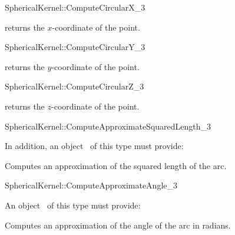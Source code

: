 \begin{ccRefFunctionObjectConcept}{SphericalKernel::ComputeCircularX_3}


       {returns the $x$-coordinate of the point.}

\end{ccRefFunctionObjectConcept}
\begin{ccRefFunctionObjectConcept}{SphericalKernel::ComputeCircularY_3}


       {returns the $y$-coordinate of the point.}

\end{ccRefFunctionObjectConcept}
\begin{ccRefFunctionObjectConcept}{SphericalKernel::ComputeCircularZ_3}


       {returns the $z$-coordinate of the point.}

\end{ccRefFunctionObjectConcept}
\begin{ccRefFunctionObjectConcept}{SphericalKernel::ComputeApproximateSquaredLength_3}

\ccRefines



In addition, an object \ccVar\ of this type must provide:

{Computes an approximation of the squared length of the arc.}

\end{ccRefFunctionObjectConcept}
\begin{ccRefFunctionObjectConcept}{SphericalKernel::ComputeApproximateAngle_3}

An object \ccVar\ of this type must provide:

{Computes an approximation of the angle of the arc in radians.}

\end{ccRefFunctionObjectConcept}
